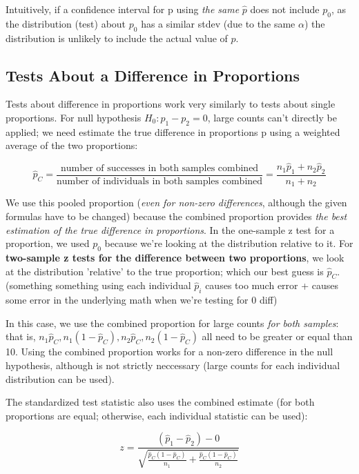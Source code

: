 \documentclass[12pt, a4paper]{article}
\theoremstyle{definition}
\begin{document}
Intuitively, if a confidence interval for p using \textit{the same} $\hat{p}$ does not include $p_0$, as the distribution (test) about $p_0$ has a similar stdev (due to the same $\alpha$) the distribution is unlikely to include the actual value of $p$.

\subsection{Tests About a Difference in Proportions}
Tests about difference in proportions work very similarly to tests about single proportions. For null hypothesis $H_0 : p_1 - p_2 = 0$, large counts can't directly be applied; we need estimate the true difference in proportions p using a weighted average of the two proportions:

\[\hat{p}_C = \frac{\textrm{number of successes in both samples combined}}{\textrm{number of individuals in both samples combined}} = \frac{n_1 \hat{p}_1 + n_2 \hat{p}_2}{n_1 + n_2}\]

We use this pooled proportion (\textit{even for non-zero differences}, although the given formulas have to be changed) because the combined proportion provides \textit{the best estimation of the true difference in proportions}.
In the one-sample z test for a proportion, we used $p_0$ because we're looking at the distribution relative to it.
For \textbf{two-sample z tests for the difference between two proportions}, we look at the distribution 'relative' to the true proportion; which our best guess is $\hat{p}_C$.
(something something using each individual $\hat{p}_i$ causes too much error + causes some error in the underlying math when we're testing for 0 diff)

In this case, we use the combined proportion for large counts \textit{for both samples}: that is, $n_1 \hat{p}_C, n_1 (1 - \hat{p}_C), n_2 \hat{p}_C, n_2 (1 - \hat{p}_C)$ all need to be greater or equal than 10.
Using the combined proportion works for a non-zero difference in the null hypothesis, although is not strictly neccessary (large counts for each individual distribution can be used).

The standardized test statistic also uses the combined estimate (for both proportions are equal; otherwise, each individual statistic can be used):

\[z = \frac{(\hat{p}_1 - \hat{p}_2) - 0}{\sqrt{\frac{\hat{p}_C (1 - \hat{p}_C)}{n_1} + \frac{\hat{p}_C (1 - \hat{p}_C)}{n_2}}}\]

\newpage
\end{document}
